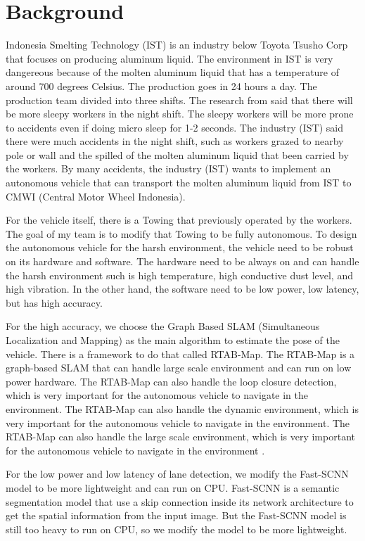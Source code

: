 \documentclass[conference]{IEEEtran}
\begin{document}
\section{Background}
Indonesia Smelting Technology (IST) is an industry below Toyota Tsusho Corp that focuses on producing aluminum liquid. The environment in IST is very dangereous because of the molten aluminum liquid that has a temperature of around 700 degrees Celsius. The production goes in 24 hours a day. The production team divided into three shifts. The research from \cite{ref_sleep} said that there will be more sleepy workers in the night shift. The sleepy workers will be more prone to accidents even if doing micro sleep for 1-2 seconds. The industry (IST) said there were much accidents in the night shift, such as workers grazed to nearby pole or wall and the spilled of the molten aluminum liquid that been carried by the workers. By many accidents, the industry (IST) wants to implement an autonomous vehicle that can transport the molten aluminum liquid from IST to CMWI (Central Motor Wheel Indonesia). 

\par    
For the vehicle itself, there is a Towing that previously operated by the workers. The goal of my team is to modify that Towing to be fully autonomous. To design the autonomous vehicle for the harsh environment, the vehicle need to be robust on its hardware and software. The hardware need to be always on and can handle the harsh environment such is high temperature, high conductive dust level, and high vibration. In the other hand, the software need to be low power, low latency, but has high accuracy.

\par    
For the high accuracy, we choose the Graph Based SLAM (Simultaneous Localization and Mapping) as the main algorithm to estimate the pose of the vehicle. There is a framework to do that called RTAB-Map. The RTAB-Map is a graph-based SLAM that can handle large scale environment and can run on low power hardware. The RTAB-Map can also handle the loop closure detection, which is very important for the autonomous vehicle to navigate in the environment. The RTAB-Map can also handle the dynamic environment, which is very important for the autonomous vehicle to navigate in the environment. The RTAB-Map can also handle the large scale environment, which is very important for the autonomous vehicle to navigate in the environment \cite{ref_rtabmap}.  

\par    
For the low power and low latency of lane detection, we modify the Fast-SCNN model \cite{ref_fast_scnn} to be more lightweight and can run on CPU. Fast-SCNN is a semantic segmentation model that use a skip connection inside its network architecture to get the spatial information from the input image. But the Fast-SCNN model is still too heavy to run on CPU, so we modify the model to be more lightweight.  
\end{document}
